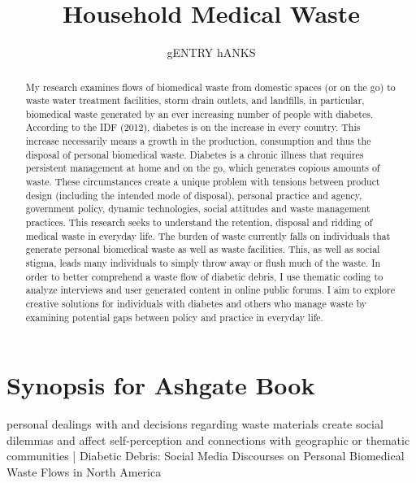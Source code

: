 \documentclass[12pt]{article}
\title{Household Medical Waste}
\author{gENTRY hANKS}
\begin{document}
\maketitle

\newpage
\begin{abstract}
\doublespacing 
My research examines flows of biomedical waste from domestic spaces (or on the go) to waste water treatment facilities, storm drain outlets, and landfills, in particular, biomedical waste generated by an ever increasing number of people with diabetes. According to the IDF (2012), diabetes is on the increase in every country. This increase necessarily means a growth in the production, consumption and thus the disposal of personal biomedical waste. Diabetes is a chronic illness that requires persistent management at home and on the go, which generates copious amounts of waste. These circumstances create a unique problem with tensions between product design (including the intended mode of disposal), personal practice and agency, government policy, dynamic technologies, social attitudes and waste management practices. This research seeks to understand the retention, disposal and ridding of medical waste in everyday life. The burden of waste currently falls on individuals that generate personal biomedical waste as well as waste facilities.  This, as well as social stigma, leads many individuals to simply throw away or flush much of the waste.  In order to better comprehend a waste flow of diabetic debris, I use thematic coding to analyze interviews and user generated content in online public forums. I aim to explore creative solutions for individuals with diabetes and others who manage waste by examining potential gaps between policy and practice in everyday life.

\end{abstract}


\newpage
\section{Synopsis for Ashgate Book}

personal dealings with and decisions regarding waste materials create social dilemmas and affect self-perception and connections with geographic or thematic communities 
| Diabetic Debris: Social Media Discourses on Personal Biomedical Waste Flows in North America 
\end{document}
